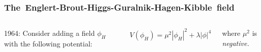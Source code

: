 \documentclass[compress]{beamer}
\begin{document}
\begin{frame}
\frametitle{\mbox{The Englert-Brout-Higgs-Guralnik-Hagen-Kibble field\hspace{-1 cm}}}

\begin{columns}

1964: Consider adding a field $\phi_H$ with the following potential:

\vspace{-0.1 cm}
\[ V(\phi_H) = \mu^2 |\phi_H|^2 + \lambda |\phi|^4 \]

\vspace{0.1 cm}
where $\mu^2$ is {\it negative.}

\end{columns}


\end{frame}
\end{document}
